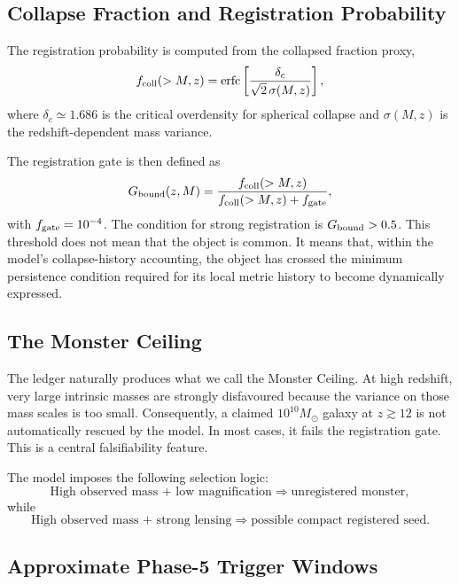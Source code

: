 \documentclass[11pt,a4paper]{article}
\newcommand{\Msun}{M_\odot}
\begin{document}
\subsection{Collapse Fraction and Registration Probability}

The registration probability is computed from the collapsed fraction proxy,
\begin{equation}
f_{\rm coll}(>M,z)=\mathrm{erfc}\left[\frac{\delta_c}{\sqrt{2}\,\sigma(M,z)}\right],
\end{equation}
where $\delta_c\simeq1.686$ is the critical overdensity for spherical collapse and $\sigma(M,z)$ is the redshift-dependent mass variance.

The registration gate is then defined as
\begin{equation}
G_{\rm bound}(z,M)=\frac{f_{\rm coll}(>M,z)}{f_{\rm coll}(>M,z)+f_{\rm gate}},
\end{equation}
with $f_{\rm gate}=10^{-4}$. The condition for strong registration is $G_{\rm bound}>0.5$. This threshold does not mean that the object is common. It means that, within the model's collapse-history accounting, the object has crossed the minimum persistence condition required for its local metric history to become dynamically expressed.

\subsection{The Monster Ceiling}

The ledger naturally produces what we call the Monster Ceiling. At high redshift, very large intrinsic masses are strongly disfavoured because the variance on those mass scales is too small. Consequently, a claimed $10^{10}\Msun$ galaxy at $z\gtrsim12$ is not automatically rescued by the model. In most cases, it fails the registration gate. This is a central falsifiability feature.

The model imposes the following selection logic:
\begin{equation}
\boxed{\text{High observed mass + low magnification}\Rightarrow\text{unregistered monster},}
\end{equation}
while
\begin{equation}
\boxed{\text{High observed mass + strong lensing}\Rightarrow\text{possible compact registered seed}.}
\end{equation}

\subsection{Approximate Phase-5 Trigger Windows}
\end{document}
